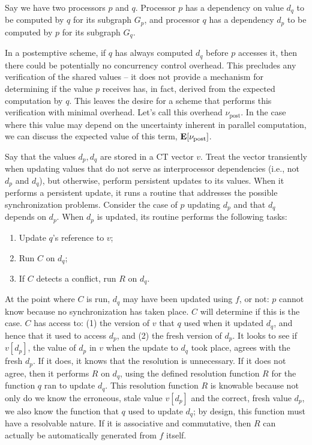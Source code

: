 Say we have two processors $p$ and $q$. Processor $p$ has a dependency on value
$d_q$ to be computed by $q$ for its subgraph $G_p$, and processor $q$ has a
dependency $d_p$ to be computed by $p$ for its subgraph $G_q$.

In a postemptive scheme, if $q$ has always computed $d_q$ before $p$ accesses
it, then there could be potentially no concurrency control overhead. This
precludes any verification of the shared values -- it does not provide a
mechanism for determining if the value $p$ receives has, in fact, derived from
the expected computation by $q$. This leaves the desire for a scheme that
performs this verification with minimal overhead. Let's call this overhead
$\nu_\text{post}$. In the case where this value may depend on the uncertainty
inherent in parallel computation, we can discuss the expected value of this
term, $\mathbf{E}[\nu_\text{post}]$.

Say that the values $d_p, d_q$ are stored in a CT vector $v$. Treat the vector
transiently when updating values that do not serve as interprocessor
dependencies (i.e., not $d_p$ and $d_q$), but otherwise, perform persistent
updates to its values. When it performs a persistent update, it runs a routine
that addresses the possible synchronization problems. Consider the case of $p$
updating $d_p$ and that $d_q$ depends on $d_p$. When $d_p$ is updated, its
routine performs the following tasks:
\begin{enumerate}
    \item Update $q$'s reference to $v$;
    \item Run $C$ on $d_q$;
    \item If $C$ detects a conflict, run $R$ on $d_q$.
\end{enumerate}

At the point where $C$ is run, $d_q$ may have been updated using $f$, or not:
$p$ cannot know because no synchronization has taken place. $C$ will determine
if this is the case. $C$ has access to: (1) the version of $v$ that $q$ used
when it updated $d_q$, and hence that it used to access $d_p$, and (2) the fresh
version of $d_p$. It looks to see if $v[d_p]$, the value of $d_p$ in $v$ when
the update to $d_q$ took place, agrees with the fresh $d_p$. If it does, it
knows that the resolution is unnecessary. If it does not agree, then it performs
$R$ on $d_q$, using the defined resolution function $R$ for the function $q$ ran
to update $d_q$. This resolution function $R$ is knowable because not only do we
know the erroneous, stale value $v[d_p]$ and the correct, fresh value $d_p$, we
also know the function that $q$ used to update $d_q$; by design, this function
must have a resolvable nature. If it is associative and commutative, then $R$
can actually be automatically generated from $f$ itself.

